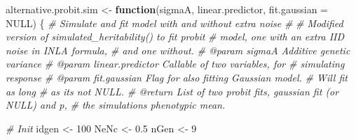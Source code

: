 \documentclass[
]{article}
\newenvironment{Shaded}{\begin{snugshade}}{\end{snugshade}}
\newcommand{\AttributeTok}[1]{\textcolor[rgb]{0.13,0.29,0.53}{#1}}
\newcommand{\CommentTok}[1]{\textcolor[rgb]{0.56,0.35,0.01}{\textit{#1}}}
\newcommand{\ConstantTok}[1]{\textcolor[rgb]{0.56,0.35,0.01}{#1}}
\newcommand{\ControlFlowTok}[1]{\textcolor[rgb]{0.13,0.29,0.53}{\textbf{#1}}}
\newcommand{\DecValTok}[1]{\textcolor[rgb]{0.00,0.00,0.81}{#1}}
\newcommand{\FloatTok}[1]{\textcolor[rgb]{0.00,0.00,0.81}{#1}}
\newcommand{\NormalTok}[1]{#1}
\newcommand{\OtherTok}[1]{\textcolor[rgb]{0.56,0.35,0.01}{#1}}
\begin{document}
\begin{Shaded}
\begin{Highlighting}[]
\NormalTok{alternative.probit.sim }\OtherTok{\textless{}{-}} \ControlFlowTok{function}\NormalTok{(sigmaA, linear.predictor,}
                                   \AttributeTok{fit.gaussian =} \ConstantTok{NULL}\NormalTok{) \{}
  \CommentTok{\#\textquotesingle{} Simulate and fit model with and without extra noise}
  \CommentTok{\#\textquotesingle{}}
  \CommentTok{\#\textquotesingle{} Modified version of \textasciigrave{}simulated\_heritability()\textasciigrave{} to fit probit}
  \CommentTok{\#\textquotesingle{} model, one with an extra IID noise in INLA formula,}
  \CommentTok{\#\textquotesingle{} and one without.}
  \CommentTok{\#\textquotesingle{} @param sigmaA Additive genetic variance}
  \CommentTok{\#\textquotesingle{} @param linear.predictor Callable of two variables, for}
  \CommentTok{\#\textquotesingle{} simulating response}
  \CommentTok{\#\textquotesingle{} @param fit.gaussian Flag for also fitting Gaussian model.}
  \CommentTok{\#\textquotesingle{} Will fit as long}
  \CommentTok{\#\textquotesingle{} as it\textquotesingle{}s not \textasciigrave{}NULL\textasciigrave{}.}
  \CommentTok{\#\textquotesingle{} @return List of two probit fits, gaussian fit (or \textasciigrave{}NULL\textasciigrave{}) and p,}
  \CommentTok{\#\textquotesingle{} the simulation\textquotesingle{}s phenotypic mean.}

  \CommentTok{\# Init}
\NormalTok{  idgen }\OtherTok{\textless{}{-}} \DecValTok{100}
\NormalTok{  NeNc }\OtherTok{\textless{}{-}} \FloatTok{0.5}
\NormalTok{  nGen }\OtherTok{\textless{}{-}} \DecValTok{9}


\end{Highlighting}
\end{Shaded}
\end{document}
